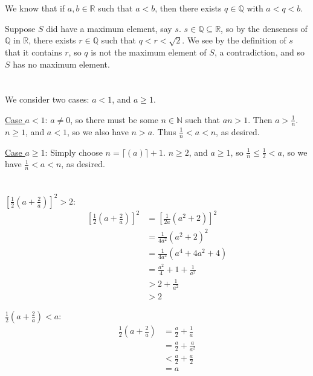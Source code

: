 \documentclass[11pt]{article}
\begin{document}
\section{} %
We know that if $a,b\in\mathbb{R}$ such that $a<b$, then there exists $q\in\mathbb{Q}$ with $a<q<b$.

Suppose $S$ did have a maximum element, say $s$.
$s\in\mathbb{Q}\subseteq\mathbb{R}$, so by the denseness of $\mathbb{Q}$ in $\mathbb{R}$, there exists $r\in\mathbb{Q}$ such that $q<r<\sqrt{2}$.
We see by the definition of $s$ that it contains $r$, so $q$ is not the maximum element of $S$, a contradiction, and so $S$ has no maximum element.


\section{} %
We consider two cases: $a<1$, and $a\ge1$.

\noindent
\underline{Case $a<1$}: $a\neq0$, so there must be some $n\in\mathbb{N}$ such that $an>1$.
Then $a>\frac{1}{n}$.
$n\ge1$, and $a<1$, so we also have $n>a$.
Thus $\frac{1}{n}<a<n$, as desired.

\noindent
\underline{Case $a\ge1$}: Simply choose $n=\lceil(a)\rceil+1$.
$n\ge2$, and $a\ge1$, so $\frac{1}{n}\le\frac{1}{2}<a$, so we have $\frac{1}{n}<a<n$, as desired.


\section{} %
\underline{$\left[\frac{1}{2}\left(a+\frac{2}{a}\right)\right]^2>2$}:
\begin{align*}
	\left[\frac{1}{2}\left(a+\frac{2}{a}\right)\right]^2
	&=\left[\frac{1}{2a}\left(a^2+2\right)\right]^2\\
	&=\frac{1}{4a^2}\left(a^2+2\right)^2\\
	&=\frac{1}{4a^2}\left(a^4+4a^2+4\right)\\
	&=\frac{a^2}{4}+1+\frac{1}{a^2}\\
	&>2+\frac{1}{a^2}\\
	&>2
\end{align*}

\noindent
\underline{$\frac{1}{2}\left(a+\frac{2}{a}\right)<a$}:
\begin{align*}
	\frac{1}{2}\left(a+\frac{2}{a}\right)
	&=\frac{a}{2}+\frac{1}{a}\\
	&=\frac{a}{2}+\frac{a}{a^2}\\
	&<\frac{a}{2}+\frac{a}{2}\\
	&=a
\end{align*}
\end{document}
